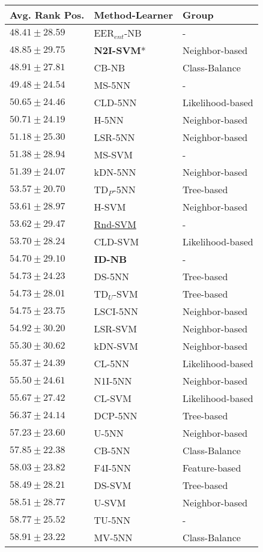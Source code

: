 \begin{tabular}{lll}
\toprule
Avg. Rank Pos. & Method-Learner & Group \\
\midrule
$48.41\pm28.59$ & EER$_{ent}$-NB & - \\
$48.85\pm29.75$ & \textbf{N2I-SVM}* & Neighbor-based \\
$48.91\pm27.81$ & CB-NB & Class-Balance \\
$49.48\pm24.54$ & MS-5NN & - \\
$50.65\pm24.46$ & CLD-5NN & Likelihood-based \\
$50.71\pm24.19$ & H-5NN & Neighbor-based \\
$51.18\pm25.30$ & LSR-5NN & Neighbor-based \\
$51.38\pm28.94$ & MS-SVM & - \\
$51.39\pm24.07$ & kDN-5NN & Neighbor-based \\
$53.57\pm20.70$ & TD$_P$-5NN & Tree-based \\
$53.61\pm28.97$ & H-SVM & Neighbor-based \\
$53.62\pm29.47$ & \underline{Rnd-SVM} & - \\
$53.70\pm28.24$ & CLD-SVM & Likelihood-based \\
$54.70\pm29.10$ & \textbf{ID-NB} & - \\
$54.73\pm24.23$ & DS-5NN & Tree-based \\
$54.73\pm28.01$ & TD$_U$-SVM & Tree-based \\
$54.75\pm23.75$ & LSCI-5NN & Neighbor-based \\
$54.92\pm30.20$ & LSR-SVM & Neighbor-based \\
$55.30\pm30.62$ & kDN-SVM & Neighbor-based \\
$55.37\pm24.39$ & CL-5NN & Likelihood-based \\
$55.50\pm24.61$ & N1I-5NN & Neighbor-based \\
$55.67\pm27.42$ & CL-SVM & Likelihood-based \\
$56.37\pm24.14$ & DCP-5NN & Tree-based \\
$57.23\pm23.60$ & U-5NN & Neighbor-based \\
$57.85\pm22.38$ & CB-5NN & Class-Balance \\
$58.03\pm23.82$ & F4I-5NN & Feature-based \\
$58.49\pm28.21$ & DS-SVM & Tree-based \\
$58.51\pm28.77$ & U-SVM & Neighbor-based \\
$58.77\pm25.52$ & TU-5NN & - \\
$58.91\pm23.22$ & MV-5NN & Class-Balance \\

\end{tabular}

